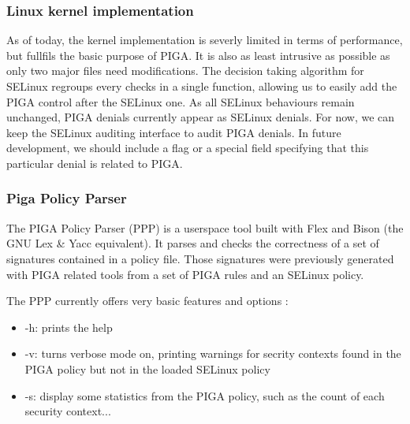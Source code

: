 \documentclass[pdftex,a4paper,titlepage,11pt]{article}
\begin{document}
\subsubsection{Linux kernel implementation}

As of today, the kernel implementation is severly limited in terms of performance, but fullfils the basic purpose of PIGA.
It is also as least intrusive as possible as only two major files need modifications. The decision taking algorithm for SELinux regroups every checks in a single function, allowing us to easily add the PIGA control after the SELinux one.
As all SELinux behaviours remain unchanged, PIGA denials currently appear as SELinux denials. For now, we can keep the SELinux auditing interface to audit PIGA denials. In future development, we should include a flag or a special field specifying that this particular denial is related to PIGA.

\subsubsection{Piga Policy Parser}

The PIGA Policy Parser (PPP) is a userspace tool built with Flex and Bison (the GNU Lex \& Yacc equivalent). It parses and checks the correctness of a set of signatures contained in a policy file. Those signatures were previously generated with PIGA related tools from a set of PIGA rules and an SELinux policy.

The PPP currently offers very basic features and options :
\begin{itemize}
	\item -h: prints the help
	\item -v: turns verbose mode on, printing warnings for secrity contexts found in the PIGA policy but not in the loaded SELinux policy
	\item -s: display some statistics from the PIGA policy, such as the count of each security context...
\end{itemize}

\smallskip
\end{document}
